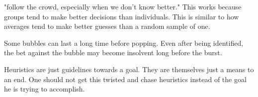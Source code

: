 \documentclass[12pt]{article}
\begin{document}
\begin{enumerate}

"follow the crowd, especially when we don't know better." This works because groups tend to make better decisions than individuals. This is similar to how averages tend to make better guesses than a random sample of one. 


Some bubbles can last a long time before popping. Even after being identified, the bet against the bubble may become insolvent long before the burst. 


Heuristics are just guidelines towards a goal. They are themselves just a means to an end. One should not get this twisted and chase heuristics instead of the goal he is trying to accomplish.

\end{enumerate}


\end{document}
